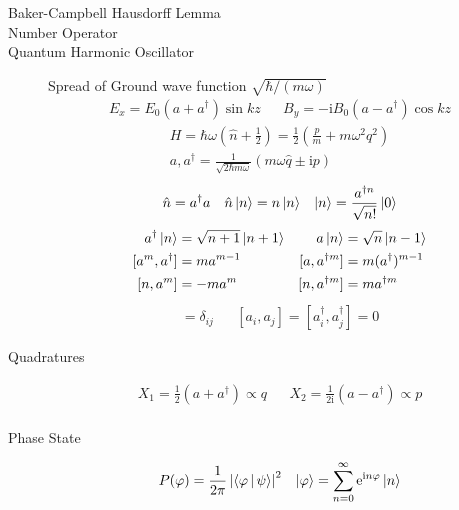 \documentclass[twocolumn, 11pt]{article}
\renewcommand{\i}{\mathrm{i}}
\newcommand{\e}{\mathrm{e}}
\newcommand{\abs}[1]{\left| #1 \right|}
\begin{document}
\begin{description}
\item[Baker-Campbell Hausdorff Lemma] 

\item[Number Operator] 
\item[Quantum Harmonic Oscillator] $ $\\
  Spread of Ground wave function $\sqrt{ \hbar /(m \omega)}$
    \begin{align*}
      E_x = E_0 (a + a^{\dagger}) \sin{k z} &&
      B_y = - \i B_0 (a - a^{\dagger}) \cos{k z}
    \end{align*}
    \begin{align*}
      H = \hbar \omega \left(\hat{n} + \frac{1}{2}\right) =
      \frac{1}{2} \left( \frac{p}{m} + m \omega^2 q^2 \right) \\ a, a^{\dagger} = \frac{1}{\sqrt{2 \hbar m \omega}}(m \omega \hat{q} \pm \i p)
    \end{align*}
    \begin{align*}
      \hat{n} = a^{\dagger} a && \hat{n} \Ket{n} = n \Ket{n} && \Ket{n} = \frac{a^{\dagger n}}{\sqrt{n!}} \Ket{0}
    \end{align*}
    \begin{align*}
      a ^{\dagger} \Ket{n} &= \sqrt{n + 1} \Ket{ n + 1} & a \Ket{n} &= \sqrt{n} \Ket{n - 1} \\
      [a^{m}, a^{\dagger}] &= m a^{m-1} & [a, a^{\dagger m}] &= m (a^{\dagger})^{m-1}  \\
      [n, a^{m}] &= - m a^{m} & [n, a^{\dagger m}] &= m a^{\dagger m}
    \end{align*}
\begin{align*}
  [a_i, a_j ^{\dagger}] = \delta_{ij} && [a_i, a_j] = [a_i^{\dagger}, a_j^{\dagger}] = 0
\end{align*}
%
  \item[Quadratures]
    \begin{align*}
      X_1 = \frac{1}{2}\left( a + a^{\dagger} \right) \propto q &&
      X_2 = \frac{1}{2 \i}\left( a - a^{\dagger} \right) \propto p \\
    \end{align*}
    
  \item[Phase State]
    \begin{align*}
      P(\varphi) = \frac{1}{2 \pi} \abs{\Braket{\varphi | \psi} }^2  &&
    \Ket{\varphi} = \sum_{n=0}^{\infty} \e^{\i n \varphi} \Ket{n}
    \end{align*}
    

\end{description}
\end{document}
